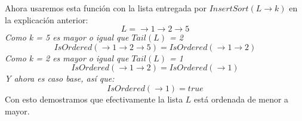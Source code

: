 \documentclass[../doc.tex]{subfiles}
\begin{document}
Ahora usaremos esta función con la lista entregada por $InsertSort(L \rightarrow k)$ en la explicación anterior:
\[L = \rightarrow 1 \rightarrow 2 \rightarrow 5\]
\emph{Como k = 5 es mayor o igual que $Tail(L)$ = 2}
\[IsOrdered(\rightarrow 1 \rightarrow 2 \rightarrow 5) = IsOrdered(\rightarrow 1 \rightarrow 2)\]
\emph{Como k = 2 es mayor o igual que $Tail(L)$ = 1}
\[IsOrdered(\rightarrow 1 \rightarrow 2) = IsOrdered(\rightarrow 1)\]
\emph{Y ahora es caso base, así que: }
\[IsOrdered(\rightarrow 1) = true\]
Con esto demostramos que efectivamente la lista $L$ está ordenada de menor a mayor. 
\end{document}
